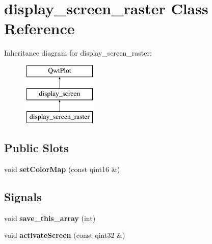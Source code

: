 \hypertarget{classdisplay__screen__raster}{}\section{display\+\_\+screen\+\_\+raster Class Reference}
\label{classdisplay__screen__raster}
Inheritance diagram for display\+\_\+screen\+\_\+raster\+:\begin{figure}[H]
\begin{center}
\leavevmode
\includegraphics[height=3.000000cm]{classdisplay__screen__raster}
\end{center}
\end{figure}
\subsection*{Public Slots}
\begin{DoxyCompactItemize}
\item 
\mbox{\label{classdisplay__screen__raster_afef6f6c99df90e06b993505646f2bb15}} 
void {\bfseries set\+Color\+Map} (const qint16 \&)
\end{DoxyCompactItemize}
\subsection*{Signals}
\begin{DoxyCompactItemize}
\item 
\mbox{\label{classdisplay__screen__raster_aec2ac79a9c9269cfb8544ae37fb12e9e}} 
void {\bfseries save\+\_\+this\+\_\+array} (int)
\item 
\mbox{\label{classdisplay__screen_ac606cfb3c58cd90b354c1b6997737074}} 
void {\bfseries activate\+Screen} (const qint32 \&)
\end{DoxyCompactItemize}
